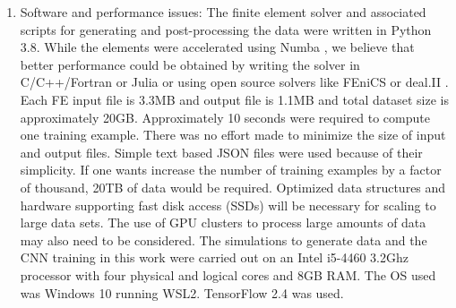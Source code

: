 \documentclass[10pt]{article}
\begin{document}
\begin{enumerate}
\item{Software and performance issues: The finite element solver and associated scripts for generating and post-processing the data were written in Python 3.8. While the elements were accelerated using Numba \cite{conf:numba}, we believe that better performance could be obtained by writing the solver in C/C++/Fortran or Julia or using open source solvers like FEniCS \cite{paper:fenics} or deal.II \cite{paper:deal.ii}. Each FE input file is 3.3MB and output file is 1.1MB and total dataset size is approximately  20GB. Approximately 10 seconds were required to compute one training example. There was no effort made to minimize the size of input and output files. Simple text based JSON files were used because of their simplicity. If one wants increase the number of training examples by a factor of thousand, 20TB of data would be required. Optimized data structures and hardware supporting fast disk access (SSDs) will be necessary for scaling to large data sets. The use of GPU clusters to process large amounts of data may also need to be considered. The simulations to generate data and the CNN training in this work were carried out on an Intel i5-4460 3.2Ghz processor with four physical and logical cores and 8GB RAM. The OS used was Windows 10 running WSL2. TensorFlow 2.4 was used.}
\end{enumerate}
\end{document}
